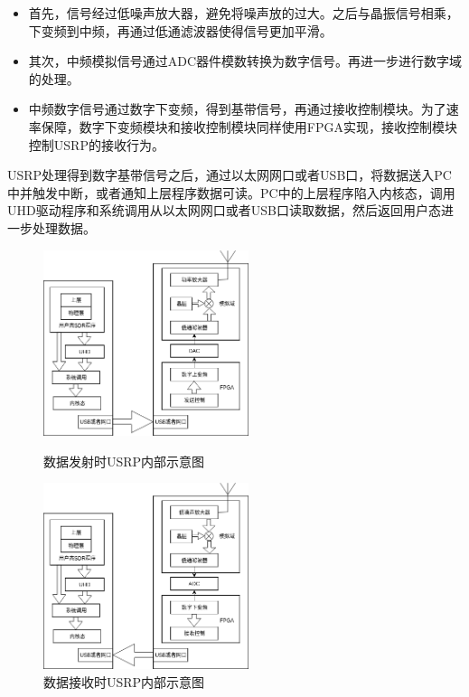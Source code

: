 \begin{itemize}
    \item 首先，信号经过低噪声放大器，避免将噪声放的过大。之后与晶振信号相乘，下变频到中频，再通过低通滤波器使得信号更加平滑。
    \item 其次，中频模拟信号通过ADC器件模数转换为数字信号。再进一步进行数字域的处理。
    \item 中频数字信号通过数字下变频，得到基带信号，再通过接收控制模块。为了速率保障，数字下变频模块和接收控制模块同样使用FPGA实现，接收控制模块控制USRP的接收行为。
\end{itemize}

USRP处理得到数字基带信号之后，通过以太网网口或者USB口，将数据送入PC中并触发中断，或者通知上层程序数据可读。PC中的上层程序陷入内核态，调用UHD驱动程序和系统调用从以太网网口或者USB口读取数据，然后返回用户态进一步处理数据。

\begin{figure}[htbp]
  \centering
  \begin{minipage}[t]{0.48\textwidth}
  \centering
  \includegraphics[width=6cm]{images/usrp_sink_theory}
  \caption{数据发射时USRP内部示意图}
  \label{usrp_sink_theory}
  \end{minipage}
  \begin{minipage}[t]{0.48\textwidth}
  \centering
  \includegraphics[width=6cm]{images/usrp_source_theory}
  \caption{数据接收时USRP内部示意图}
  \label{usrp_source_theory}
  \end{minipage}
\end{figure}


